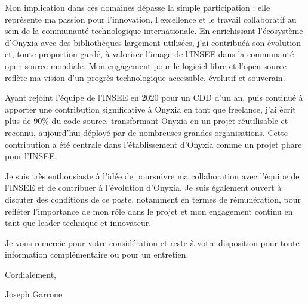 \documentclass[11pt,a4paper]{article}
\begin{document}
\vspace{1em}

Mon implication dans ces domaines dépasse la simple participation ; elle représente ma passion pour l'innovation, l'excellence et le travail collaboratif au sein de la communauté technologique internationale. En enrichissant l'écosystème d'Onyxia avec des bibliothèques largement utilisées, j'ai contribuéà son évolution et, toute proportion gardé, à valoriser l'image de l'INSEE dans la communauté open source mondiale. Mon engagement pour le logiciel libre et l'open source reflète ma vision d'un progrès technologique accessible, évolutif et souverain.

\vspace{1em}

Ayant rejoint l'équipe de l'INSEE en 2020 pour un CDD d'un an, puis continué à apporter une contribution significative à Onyxia en tant que freelance, j'ai écrit plus de 90\% du code source, transformant Onyxia en un projet réutilisable et reconnu, aujourd'hui déployé par de nombreuses grandes organisations. Cette contribution a été centrale dans l'établissement d'Onyxia comme un projet phare pour l'INSEE.

\vspace{1em}

Je suis très enthousiaste à l'idée de poursuivre ma collaboration avec l'équipe de l'INSEE et de contribuer à l'évolution d'Onyxia. Je suis également ouvert à discuter des conditions de ce poste, notamment en termes de rémunération, pour refléter l'importance de mon rôle dans le projet et mon engagement continu en tant que leader technique et innovateur.

\vspace{1em}

Je vous remercie pour votre considération et reste à votre disposition pour toute information complémentaire ou pour un entretien.

\vspace{2em}

Cordialement,

\vspace{1em}

Joseph Garrone
\end{document}
